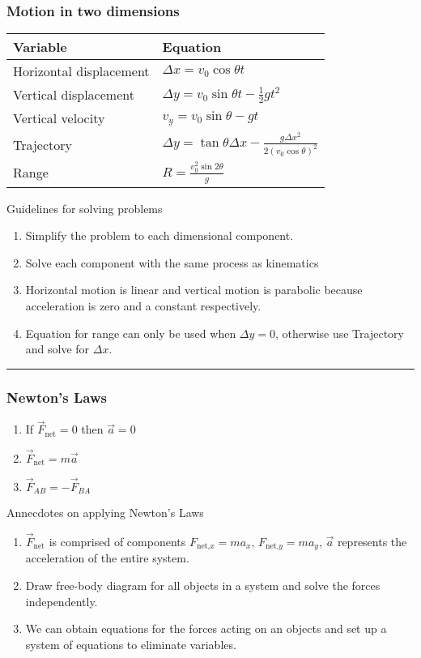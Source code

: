 \documentclass{article}
\begin{document}
\subsubsection*{Motion in two dimensions}
\begin{minipage}{0.45\textwidth}
\begin{tabular}{|l|l|}
	\hline
	Variable & Equation \\
	\hline
	Horizontal displacement & $\Delta x = v_0 \cos \theta t$ \\
	Vertical displacement & $\Delta y = v_0 \sin \theta t - \frac{1}{2}gt^2$ \\
	Vertical velocity & $v_y = v_0 \sin \theta - gt$ \\
	Trajectory & $\Delta y = \tan \theta \Delta x - \frac{g \Delta x^2}{2(v_0\cos \theta)^2}$ \\
	Range & $R = \frac{v_0^2 \sin 2\theta}{g}$ \\
	\hline
\end{tabular}
\end{minipage}
\begin{minipage}{0.45\textwidth}
Guidelines for solving problems
	\begin{enumerate}
		\item Simplify the problem to each dimensional component.
		\item Solve each component with the same process as kinematics
		\item Horizontal motion is linear and vertical motion is parabolic because acceleration is zero and a constant respectively.
		\item Equation for range can only be used when $\Delta y = 0$, otherwise use Trajectory and solve for $\Delta x$.
	\end{enumerate}
\end{minipage}
\hrule

\pagebreak
\subsubsection*{Newton's Laws}
\begin{minipage}{0.4\textwidth}
\begin{enumerate}
	\item If $\vec{F}_\text{net} = 0$ then $\vec{a}=0$
	\item $\vec{F}_\text{net} = m \vec{a}$
	\item $\vec{F}_{AB} = - \vec{F}_{BA}$
\end{enumerate}
\end{minipage}
\begin{minipage}{0.5\textwidth}
Annecdotes on applying Newton's Laws
\begin{enumerate}
	\item $\vec{F}_\text{net}$ is comprised of components $F_{\text{net,}x} = m a_x$, $F_{\text{net,}y} = m a_y$, $\vec{a}$ represents the acceleration of the entire system.
	\item Draw free-body diagram for all objects in a system and solve the forces independently.
	\item We can obtain equations for the forces acting on an objects and set up a system of equations to eliminate variables.
\end{enumerate}
\end{minipage}
\end{document}
